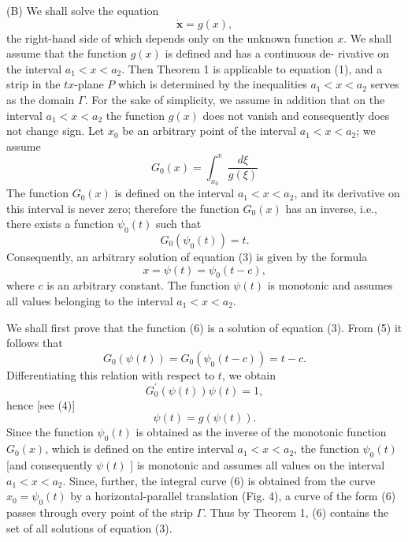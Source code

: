 \documentclass[10pt,a5paper]{book}
\theoremstyle{plain}
\theoremstyle{definition}
\theoremstyle{remark}
\begin{document}
(B) We shall solve the equation
\begin{equation*}
\dot{\boldsymbol{x}}=g(x), \tag{3}
\end{equation*}
the right-hand side of which depends only on the unknown function $x$. We shall assume that the function $g(x)$ is defined and has a continuous de-
rivative on the interval $a_{1}<x<a_{2}$. Then Theorem 1 is applicable to equation (1), and a strip in the $t x$-plane $P$ which is determined by the inequalities $a_{1}<x<a_{2}$ serves as the domain $\Gamma$. For the sake of simplicity, we assume in addition that on the interval $a_{1}<x<a_{2}$ the function $g(x)$ does not vanish and consequently does not change sign. Let $x_{0}$ be an arbitrary point of the interval $a_{1}<x<a_{2}$; we assume
\begin{equation*}
G_{0}(x)=\int_{x_{0}}^{x} \frac{d \xi}{g(\xi)} \tag{4}
\end{equation*}
The function $G_{0}(x)$ is defined on the interval $a_{1}<x<a_{2}$, and its derivative on this interval is never zero; therefore the function $G_{0}(x)$ has an inverse, i.e., there exists a function $\psi_{0}(t)$ such that
\begin{equation*}
G_{0}\left(\psi_{0}(t)\right)=t . \tag{5}
\end{equation*}
Consequently, an arbitrary solution of equation (3) is given by the formula
\begin{equation*}
x=\psi(t)=\psi_{0}(t-c), \tag{6}
\end{equation*}
where $c$ is an arbitrary constant. The function $\psi(t)$ is monotonic and assumes all values belonging to the interval $a_{1}<x<a_{2}$.

We shall first prove that the function (6) is a solution of equation (3). From (5) it follows that
\begin{equation*}
G_{0}(\psi(t))=G_{0}\left(\psi_{0}(t-c)\right)=t-c . \tag{7}
\end{equation*}
Differentiating this relation with respect to $t$, we obtain
\[
G_{0}^{\prime}(\psi(t)) \psi(t)=1,
\]
hence [see (4)]
\[
\psi(t)=g(\psi(t)) .
\]
Since the function $\psi_{0}(t)$ is obtained as the inverse of the monotonic function $G_{0}(x)$, which is defined on the entire interval $a_{1}<x<a_{2}$, the function $\psi_{0}(t)$ [and consequently $\psi(t)$ ] is monotonic and assumes all values on the interval $a_{1}<x<a_{2}$. Since, further, the integral curve (6) is obtained from the curve $x_{0}=\psi_{0}(t)$ by a horizontal-parallel translation (Fig. 4), a curve of the form (6) passes through every point of the strip $\Gamma$. Thus by Theorem 1, (6) contains the set of all solutions of equation (3).
\end{document}
